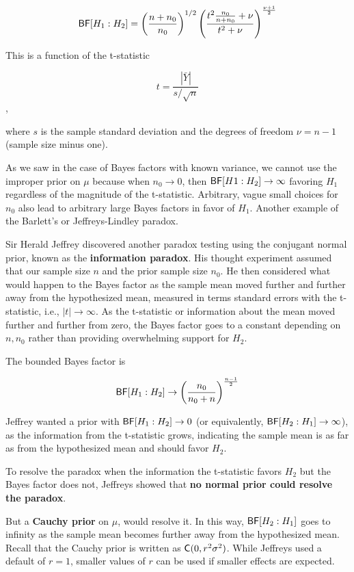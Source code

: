 \documentclass[]{book}
\theoremstyle{definition}
\theoremstyle{definition}
\theoremstyle{definition}
\theoremstyle{remark}
\begin{document}
\[\textsf{BF}[H_1 : H_2] = \left(\frac{n + n_0}{n_0} \right)^{1/2} \left(
  \frac{ t^2  \frac{n_0}{n + n_0} + \nu }
  { t^2  + \nu} \right)^{\frac{\nu + 1}{2}}\]

This is a function of the t-statistic

\[t = \frac{|\bar{Y}|}{s/\sqrt{n}}\],

where \(s\) is the sample standard deviation and the degrees of freedom
\(\nu = n-1\) (sample size minus one).

As we saw in the case of Bayes factors with known variance, we cannot
use the improper prior on \(\mu\) because when \(n_0 \to 0\), then
\(\textsf{BF}[H1:H_2] \to \infty\) favoring \(H_1\) regardless of the magnitude
of the t-statistic. Arbitrary, vague small choices for \(n_0\) also lead
to arbitrary large Bayes factors in favor of \(H_1\). Another example of
the Barlett's or Jeffreys-Lindley paradox.

Sir Herald Jeffrey discovered another paradox testing using the
conjugant normal prior, known as the \textbf{information paradox}. His
thought experiment assumed that our sample size \(n\) and the prior
sample size \(n_0\). He then considered what would happen to the Bayes
factor as the sample mean moved further and further away from the
hypothesized mean, measured in terms standard errors with the
t-statistic, i.e., \(|t| \to \infty\). As the t-statistic or information
about the mean moved further and further from zero, the Bayes factor
goes to a constant depending on \(n, n_0\) rather than providing
overwhelming support for \(H_2\).

The bounded Bayes factor is

\[\textsf{BF}[H_1 : H_2] \to \left( \frac{n_0}{n_0 + n}  \right)^{\frac{n - 1}{2}}\]

Jeffrey wanted a prior with \(\textsf{BF}[H_1 : H_2] \to 0\) (or equivalently,
\(\textsf{BF}[H_2 : H_1] \to \infty\)), as the information from the t-statistic
grows, indicating the sample mean is as far as from the hypothesized
mean and should favor \(H_2\).

To resolve the paradox when the information the t-statistic favors
\(H_2\) but the Bayes factor does not, Jeffreys showed that \textbf{no
normal prior could resolve the paradox}.

But a \textbf{Cauchy prior} on \(\mu\), would resolve it. In this way,
\(\textsf{BF}[H_2 : H_1]\) goes to infinity as the sample mean becomes further
away from the hypothesized mean. Recall that the Cauchy prior is written
as \(\textsf{C}(0, r^2 \sigma^2)\). While Jeffreys used a default of \(r = 1\),
smaller values of \(r\) can be used if smaller effects are expected.
\end{document}
